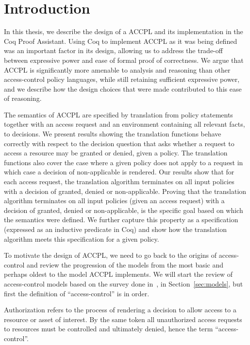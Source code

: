 \documentclass[runningheads,a4paper]{llncs}
\begin{document}
\section{Introduction}\label{sec:intro}
In this thesis, we describe the design of a \ac{ACCPL} and its implementation in the Coq Proof Assistant. Using Coq to implement \ac{ACCPL} as it was being defined was an important factor in its design, allowing us to address the trade-off between expressive power and ease of formal proof of correctness. We argue that \ac{ACCPL} is significantly more amenable to analysis and reasoning than other access-control policy languages, while still retaining sufficient expressive power, and we describe how the design choices that were made contributed to this ease of reasoning. 

The semantics of \ac{ACCPL} are specified by translation from policy statements together with an access request and an environment containing all relevant facts, to decisions. We present results showing the translation functions behave correctly with respect to the decision question that asks whether a request to access a resource may be granted or denied, given a policy. The translation functions also cover the case where a given policy does not apply to a request in which case a decision of non-applicable is rendered. Our results show that for each access request, the translation algorithm terminates on all input policies with a decision of granted, denied or non-applicable. Proving that the translation algorithm terminates on all input policies (given an access request) with a decision of granted, denied or non-applicable, is the specific goal based on which the semantics were defined. We further capture this property as a specification (expressed as an inductive predicate in Coq) and show how the translation algorithm meets this specification for a given policy. 

To motivate the design of \ac{ACCPL}, we need to go back to the origins of access-control and review the progression of the models from the most basic and perhaps oldest to the model \ac{ACCPL} implements. We will start the review of access-control models based on the survey done in~\cite{nist}, in Section~\ref{sec:models}, but first the definition of ``access-control'' is in order.

Authorization refers to the process of rendering a decision to allow access to a resource or asset of interest. By the same token all unauthorized access requests to resources must be controlled and ultimately denied, hence the term ``access-control''. 
\end{document}
